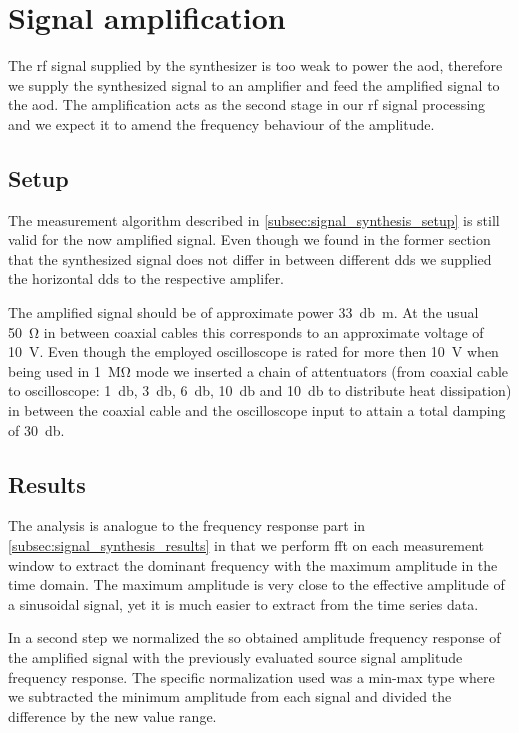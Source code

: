 \section{Signal amplification}

The \gls{rf} signal supplied by the synthesizer is too weak to power the
\gls{aod}, therefore we supply the synthesized signal to an amplifier and
feed the amplified signal to the \gls{aod}. The amplification acts as the
second stage in our \gls{rf} signal processing and we expect it to amend
the frequency behaviour of the amplitude.

\subsection{Setup}

The measurement algorithm described in \cref{subsec:signal_synthesis_setup} is
still valid for the now amplified signal. Even though we found in the former
section that the synthesized signal does not differ in between different
\gls{dds} we supplied the horizontal \gls{dds} to the respective amplifer.

The amplified signal should be of approximate power \SI{33}{\decibel\meter}.
At the usual \SI{50}{\ohm} in between coaxial cables this corresponds to an
approximate voltage of \SI{10}{\volt}. Even though the employed oscilloscope
is rated for more then \SI{10}{\volt} when being used in \SI{1}{\mega\ohm}
mode we inserted a chain of attentuators (from coaxial cable to
oscilloscope: \SI{1}{\decibel}, \SI{3}{\decibel}, \SI{6}{\decibel},
\SI{10}{\decibel} and \SI{10}{\decibel} to distribute heat dissipation) in
between the coaxial cable and the oscilloscope input to attain a total
damping of \SI{30}{\decibel}.

\subsection{Results}

The analysis is analogue to the frequency response part in
\cref{subsec:signal_synthesis_results} in that we perform \gls{fft} on each
measurement window to extract the dominant frequency with the maximum
amplitude in the time domain. The maximum amplitude is very close to the
effective amplitude of a sinusoidal signal, yet it is much easier to extract
from the time series data.

In a second step we normalized the so obtained amplitude frequency response
of the amplified signal with the previously evaluated source signal amplitude
frequency response. The specific normalization used was a min-max type where
we subtracted the minimum amplitude from each signal and divided the
difference by the new value range.

